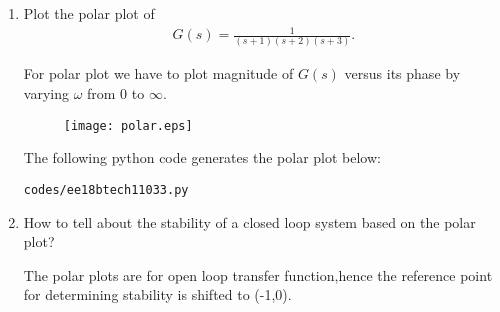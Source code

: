 \begin{enumerate}[label=\thesection.\arabic*.,ref=\thesection.\theenumi]
\item Plot the polar plot of 
\begin{align}
G(s) = \frac{1}{(s+1)(s+2)(s+3)}. 
\end{align}

\solution
For polar plot we have to plot magnitude of $G(s)$ versus its phase
by varying $\omega$ from 0 to $\infty$.


\begin{figure}[!h]
  \texttt{[image: polar.eps]}
  \label{fig:polarplot}
\end{figure}

The following python code generates the polar plot below: 
\begin{lstlisting}
codes/ee18btech11033.py
\end{lstlisting}
\item How to tell about the stability of a closed loop system based on the polar plot?

\solution
The polar plots are for open loop transfer function,hence the reference point for determining stability is shifted to (-1,0).
\end{enumerate}
